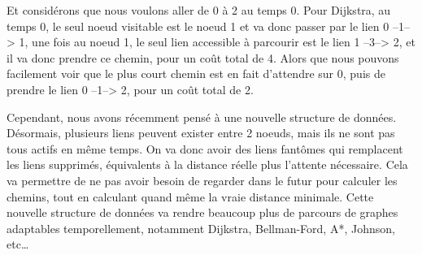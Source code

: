 \begin{adjustbox}{margin=0cm -2cm 0cm -2.5cm} 

\begin{adjustbox}{raise=1cm}
\end{adjustbox}
\begin{adjustbox}{margin=-1cm}
\end{adjustbox}
\begin{adjustbox}{raise=1cm, margin=2.5cm}
\end{adjustbox}
\begin{adjustbox}{margin=-3cm}
\end{adjustbox}

\end{adjustbox}
    
Et considérons que nous voulons aller de 0 à 2 au temps 0.
Pour Dijkstra, au temps 0, le seul noeud visitable est le noeud 1 et va donc passer par le lien 0 --1--> 1, une fois au noeud 1, le seul lien accessible à parcourir est le lien 1 --3--> 2, et il va donc prendre ce chemin, pour un coût total de 4.
Alors que nous pouvons facilement voir que le plus court chemin est en fait d'attendre sur 0, puis de prendre le lien 0 --1--> 2, pour un coût total de 2.

Cependant, nous avons récemment pensé à une nouvelle structure de données.
Désormais, plusieurs liens peuvent exister entre 2 noeuds, mais ils ne sont pas tous actifs en même temps.
On va donc avoir des liens fantômes qui remplacent les liens supprimés, équivalents à la distance réelle plus l'attente nécessaire.
Cela va permettre de ne pas avoir besoin de regarder dans le futur pour calculer les chemins, tout en calculant quand même la vraie distance minimale.
Cette nouvelle structure de données va rendre beaucoup plus de parcours de graphes adaptables temporellement, notamment Dijkstra, Bellman-Ford, A*, Johnson, etc\dots

